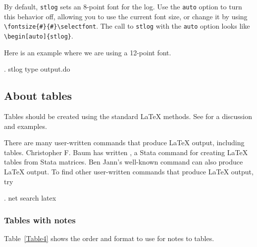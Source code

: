 By default, \texttt{stlog} sets an 8-point font for the log.  Use the
\texttt{auto} option to turn this behavior off, allowing you to use the
current font size, or change it by using\\ \verb+\fontsize{#}{#}\selectfont+.
The call to \texttt{stlog} with the \texttt{auto} option looks like
\verb+\begin[auto]{stlog}+.

Here is an example where we are using a 12-point font.

\vspace{-.2in}
{\fontsize{12}{13}\selectfont
\begin{stlog}[auto]
. stlog type output.do
\end{stlog}
}

\subsection{About tables}

Tables should be created using the standard \LaTeX{} methods.  See
\citet{latexbook} for a discussion and examples.

There are many user-written commands that produce \LaTeX{} output, including
tables.  Christopher F. Baum has written , a Stata command for
creating \LaTeX{} tables from Stata matrices.  Ben Jann's well-known
 command can also produce \LaTeX{} output.  To find other
user-written commands that produce \LaTeX{} output, try

\begin{stlog}
. net search latex
\end{stlog}
\clearpage

\subsubsection{Tables with notes}

Table~\ref{Table4} shows the order and format to use for notes to tables.

